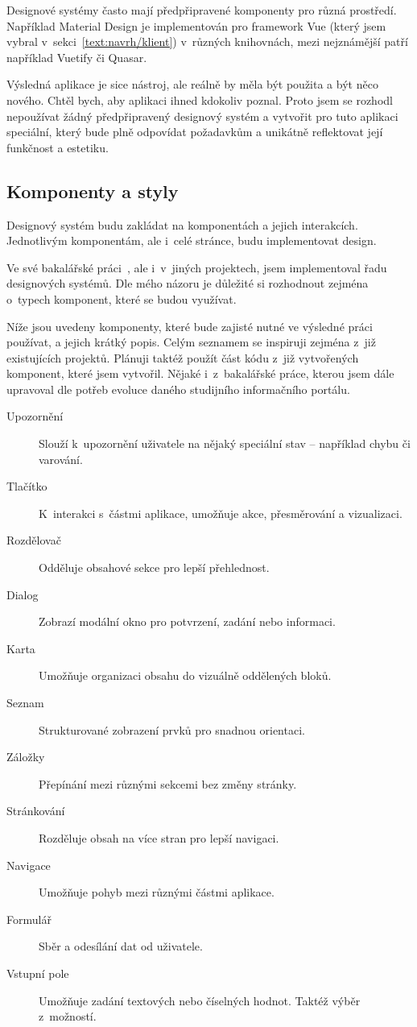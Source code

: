 Designové systémy často mají předpřipravené komponenty pro různá prostředí. 
Například Material Design je implementován pro framework Vue (který jsem vybral v~sekci~\ref{text:navrh/klient}) v~různých knihovnách, mezi nejznámější patří například Vuetify či Quasar.

Výsledná aplikace je sice nástroj, ale reálně by měla být použita a být něco nového. 
Chtěl bych, aby aplikaci ihned kdokoliv poznal. 
Proto jsem se rozhodl nepoužívat žádný předpřipravený designový systém a vytvořit pro tuto aplikaci speciální, který bude plně odpovídat požadavkům a unikátně reflektovat její funkčnost a estetiku.

\subsection{Komponenty a styly}\label{text:navrh/desgin/komponenty}\label{text:navrh/design/komponenty}

Designový systém budu zakládat na komponentách a jejich interakcích.
Jednotlivým komponentám, ale i~celé stránce, budu implementovat design.

Ve své bakalářské práci~\cite{cajthaml_bp}, ale i~v~jiných projektech, jsem implementoval řadu designových systémů.
Dle mého názoru je důležité si rozhodnout zejména o~typech komponent, které se budou využívat.

Níže jsou uvedeny komponenty, které bude zajisté nutné ve výsledné práci používat, a jejich krátký popis.
Celým seznamem se inspiruji zejména z~již existujících projektů.
Plánuji taktéž použít část kódu z~již vytvořených komponent, které jsem vytvořil.
Nějaké i~z~bakalářské práce, kterou jsem dále upravoval dle potřeb evoluce daného studijního informačního portálu. 

\begin{description} 
    \item[Upozornění] Slouží k~upozornění uživatele na nějaký speciální stav – například chybu či varování. 
    \item[Tlačítko] K~interakci s~částmi aplikace, umožňuje akce, přesměrování a vizualizaci. 
    \item[Rozdělovač] Odděluje obsahové sekce pro lepší přehlednost. 
    \item[Dialog] Zobrazí modální okno pro potvrzení, zadání nebo informaci. 
    \item[Karta] Umožňuje organizaci obsahu do vizuálně oddělených bloků. 
    \item[Seznam] Strukturované zobrazení prvků pro snadnou orientaci. 
    \item[Záložky] Přepínání mezi různými sekcemi bez změny stránky. 
    \item[Stránkování] Rozděluje obsah na více stran pro lepší navigaci. 
    \item[Navigace] Umožňuje pohyb mezi různými částmi aplikace. 
    \item[Formulář] Sběr a odesílání dat od uživatele. 
    \item[Vstupní pole] Umožňuje zadání textových nebo číselných hodnot. Taktéž výběr z~možností.
\end{description}

